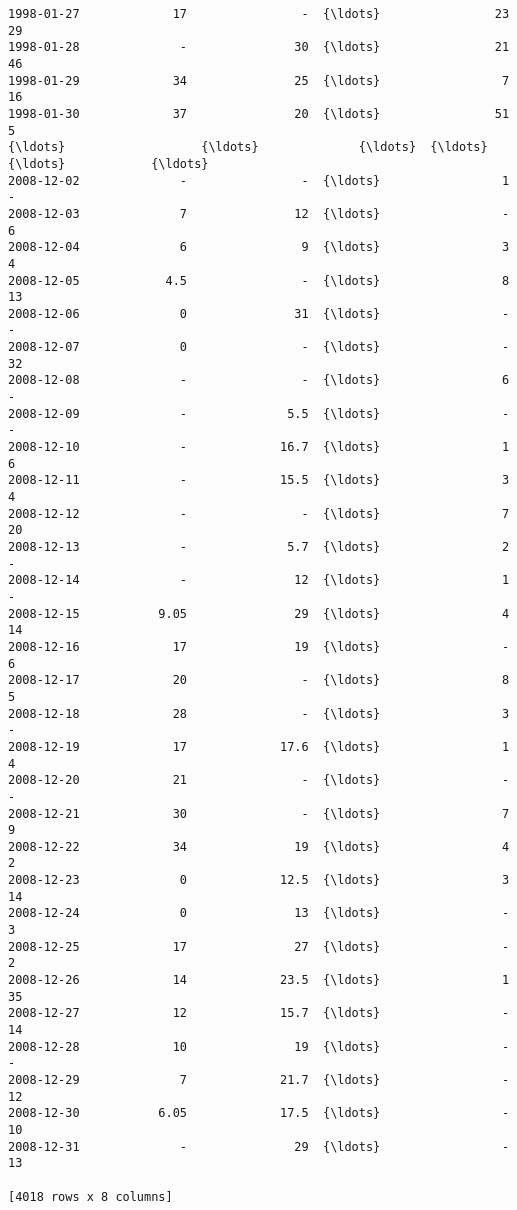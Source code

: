 \documentclass[11pt]{article}
\begin{document}
\begin{tcolorbox}[breakable, size=fbox, boxrule=.5pt, pad at break*=1mm, opacityfill=0]
\begin{Verbatim}[commandchars=\\\{\}]
1998-01-27             17                -  {\ldots}                23             29
1998-01-28              -               30  {\ldots}                21             46
1998-01-29             34               25  {\ldots}                 7             16
1998-01-30             37               20  {\ldots}                51              5
{\ldots}                   {\ldots}              {\ldots}  {\ldots}               {\ldots}            {\ldots}
2008-12-02              -                -  {\ldots}                 1              -
2008-12-03              7               12  {\ldots}                 -              6
2008-12-04              6                9  {\ldots}                 3              4
2008-12-05            4.5                -  {\ldots}                 8             13
2008-12-06              0               31  {\ldots}                 -              -
2008-12-07              0                -  {\ldots}                 -             32
2008-12-08              -                -  {\ldots}                 6              -
2008-12-09              -              5.5  {\ldots}                 -              -
2008-12-10              -             16.7  {\ldots}                 1              6
2008-12-11              -             15.5  {\ldots}                 3              4
2008-12-12              -                -  {\ldots}                 7             20
2008-12-13              -              5.7  {\ldots}                 2              -
2008-12-14              -               12  {\ldots}                 1              -
2008-12-15           9.05               29  {\ldots}                 4             14
2008-12-16             17               19  {\ldots}                 -              6
2008-12-17             20                -  {\ldots}                 8              5
2008-12-18             28                -  {\ldots}                 3              -
2008-12-19             17             17.6  {\ldots}                 1              4
2008-12-20             21                -  {\ldots}                 -              -
2008-12-21             30                -  {\ldots}                 7              9
2008-12-22             34               19  {\ldots}                 4              2
2008-12-23              0             12.5  {\ldots}                 3             14
2008-12-24              0               13  {\ldots}                 -              3
2008-12-25             17               27  {\ldots}                 -              2
2008-12-26             14             23.5  {\ldots}                 1             35
2008-12-27             12             15.7  {\ldots}                 -             14
2008-12-28             10               19  {\ldots}                 -              -
2008-12-29              7             21.7  {\ldots}                 -             12
2008-12-30           6.05             17.5  {\ldots}                 -             10
2008-12-31              -               29  {\ldots}                 -             13

[4018 rows x 8 columns]
\end{Verbatim}
\end{tcolorbox}
        
\end{document}

